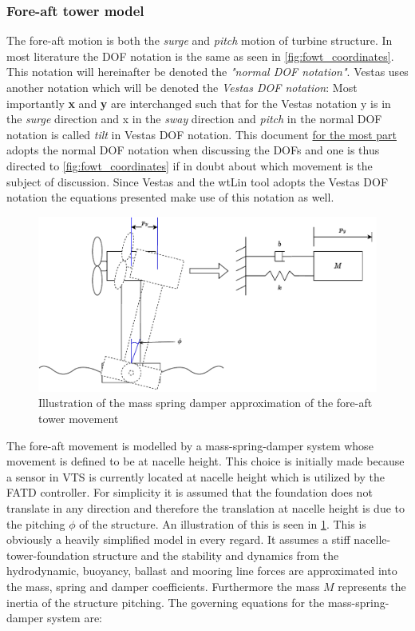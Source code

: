 \subsubsection{Fore-aft tower model} \label{sec:comp_foreaft_mod}
The fore-aft motion is both the \textit{surge} and \textit{pitch} motion of turbine structure. In most literature the DOF notation is the same as seen in \cref{fig:fowt_coordinates}. This notation will hereinafter be denoted the \textit{"normal DOF notation"}. Vestas uses another notation which will be denoted the \textit{Vestas DOF notation}: Most importantly \textbf{x} and \textbf{y} are interchanged such that for the Vestas notation y is in the \textit{surge} direction and x in the \textit{sway} direction and \textit{pitch} in the normal DOF notation is called \textit{tilt} in Vestas DOF notation. This document \underline{for the most part} adopts the normal DOF notation when discussing the DOFs and one is thus directed to \cref{fig:fowt_coordinates} if in doubt about which movement is the subject of discussion. Since Vestas and the wtLin tool adopts the Vestas DOF notation the equations presented make use of this notation as well.
\begin{figure}[ht]
	\centering
	\includegraphics[width=0.9\linewidth]{Graphics/wtLinForeAftMotionModel.pdf}
	\caption{Illustration of the mass spring damper approximation of the fore-aft tower movement}
	\label{fig:wtLin_fore-aft_diagram}
\end{figure}
The fore-aft movement is modelled by a mass-spring-damper system whose movement is defined to be at nacelle height. This choice is initially made because a sensor in VTS is currently located at nacelle height which is utilized by the FATD controller. For simplicity it is assumed that the foundation does not translate in any direction and therefore the translation at nacelle height is due to the pitching $ \phi $ of the structure. An illustration of this is seen in \cref{fig:wtLin_fore-aft_diagram}. This is obviously a heavily simplified model in every regard. It assumes a stiff nacelle-tower-foundation structure and the stability and dynamics from the hydrodynamic, buoyancy, ballast and mooring line forces are approximated into the mass, spring and damper coefficients. Furthermore the mass $ M $ represents the inertia of the structure pitching. The governing equations for the mass-spring-damper system are:
